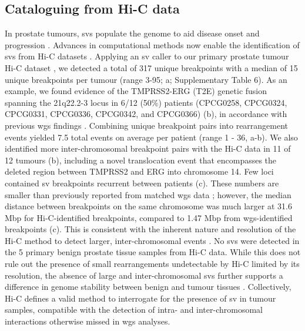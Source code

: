 \subsection{Cataloguing  from Hi-C data}

In prostate tumours, \glspl{sv} populate the genome to aid disease onset and progression \cite{fraserGenomicHallmarksLocalized2017,quigleyGenomicHallmarksStructural2018}.
Advances in computational methods now enable the identification of \glspl{sv} from Hi-C datasets \cite{dixonIntegrativeDetectionAnalysis2018,hoStructuralVariationSequencing2019}.
Applying an \gls{sv} caller to our primary prostate tumour Hi-C dataset \cite{dixonIntegrativeDetectionAnalysis2018}, we detected a total of 317 unique breakpoints with a median of 15 unique breakpoints per tumour (range 3-95; a; Supplementary Table 6).
As an example, we found evidence of the TMPRSS2-ERG (T2E) genetic fusion spanning the 21q22.2-3 locus in 6/12 (50\%) patients (CPCG0258, CPCG0324, CPCG0331, CPCG0336, CPCG0342, and CPCG0366) (b), in accordance with previous \gls{wgs} findings \cite{fraserGenomicHallmarksLocalized2017}.
Combining unique breakpoint pairs into rearrangement events yielded 7.5 total events on average per patient (range 1 - 36, a-b).
We also identified more inter-chromosomal breakpoint pairs with the Hi-C data in 11 of 12 tumours (b), including a novel translocation event that encompasses the deleted region between TMPRSS2 and ERG into chromosome 14.
Few loci contained \gls{sv} breakpoints recurrent between patients (c).
These numbers are smaller than previously reported from matched \gls{wgs} data \cite{fraserGenomicHallmarksLocalized2017}; however, the median distance between breakpoints on the same chromosome was much larger at 31.6 Mbp for Hi-C-identified breakpoints, compared to 1.47 Mbp from \gls{wgs}-identified breakpoints (c).
This is consistent with the inherent nature and resolution of the Hi-C method to detect larger, inter-chromosomal events \cite{dixonIntegrativeDetectionAnalysis2018}.
No \glspl{sv} were detected in the 5 primary benign prostate tissue samples from Hi-C data.
While this does not rule out the presence of small rearrangements undetectable by Hi-C limited by its resolution, the absence of large and inter-chromosomal \glspl{sv} further supports a difference in genome stability between benign and tumour tissues \cite{fraserGenomicHallmarksLocalized2017,bergerGenomicComplexityPrimary2011,bacaPunctuatedEvolutionProstate2013,mazrooeiCistromePartitioningReveals2019}.
Collectively, Hi-C defines a valid method to interrogate for the presence of \gls{sv} in tumour samples, compatible with the detection of intra- and inter-chromosomal interactions otherwise missed in \gls{wgs} analyses.

